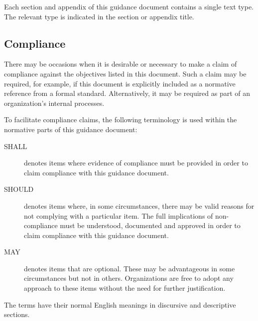 Each section and appendix of this guidance document contains a single text type. The relevant type is indicated in the section or appendix title.

\subsection{Compliance}
There may be occasions when it is desirable or necessary to make a claim of compliance against the objectives listed in this document. Such a claim may be required, for example, if this document is explicitly included as a normative reference from a formal standard. Alternatively, it may be required as part of an organization's internal processes.

To facilitate compliance claims, the following terminology is used within the normative parts of this guidance document:
\begin{description}
	\item[SHALL] denotes items where evidence of compliance must be provided in order to claim compliance with this guidance document.
	\item[SHOULD] denotes items where, in some circumstances, there may be valid reasons for not complying with a particular item. The full implications of non-compliance must be understood, documented and approved in order to claim compliance with this guidance document.
	\item[MAY] denotes items that are optional. These may be advantageous in some circumstances but not in others. Organizations are free to adopt any approach to these items without the need for further justification.
\end{description}

The terms have their normal English meanings in discursive and descriptive sections.
